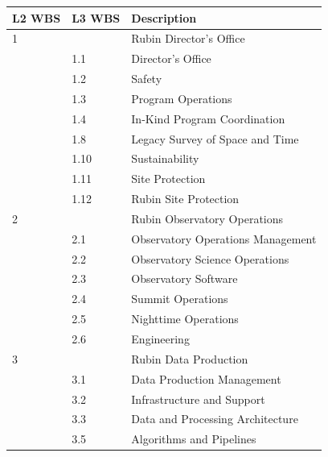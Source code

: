 \begin{longtable}[]{@{}lll@{}}

\hline
L2 \gls{WBS} & L3 \gls{WBS} & Description \tabularnewline
\hline
\endhead

1 & & Rubin Director's Office  \tabularnewline
  & 1.1 & \hspace{0.5cm} Director's Office  \tabularnewline
  & 1.2 & \hspace{0.5cm} Safety  \tabularnewline
  & 1.3 & \hspace{0.5cm} Program Operations\footnotemark[1]  \tabularnewline
  & 1.4 & \hspace{0.5cm} In-Kind Program Coordination  \tabularnewline
  & 1.8 & \hspace{0.5cm} Legacy Survey of Space and Time  \tabularnewline
  & 1.10 & \hspace{0.5cm} Sustainability  \tabularnewline
  & 1.11 & \hspace{0.5cm} Site Protection  \tabularnewline
  & 1.12 & \hspace{0.5cm} Rubin Site Protection  \tabularnewline
2 & & Rubin Observatory Operations  \tabularnewline
  & 2.1 & \hspace{0.5cm} Observatory Operations Management  \tabularnewline
  & 2.2 & \hspace{0.5cm} Observatory Science Operations  \tabularnewline
  & 2.3 & \hspace{0.5cm} Observatory Software  \tabularnewline
  & 2.4 & \hspace{0.5cm} Summit Operations  \tabularnewline
  & 2.5 & \hspace{0.5cm} Nighttime Operations  \tabularnewline
  & 2.6 & \hspace{0.5cm} Engineering  \tabularnewline
3 & & Rubin Data Production \tabularnewline
  & 3.1 & \hspace{0.5cm} Data Production Management  \tabularnewline
  & 3.2 & \hspace{0.5cm} Infrastructure and Support  \tabularnewline
  & 3.3 & \hspace{0.5cm} Data and Processing Architecture  \tabularnewline
  & 3.5 & \hspace{0.5cm} Algorithms and Pipelines  \tabularnewline

\end{longtable}

